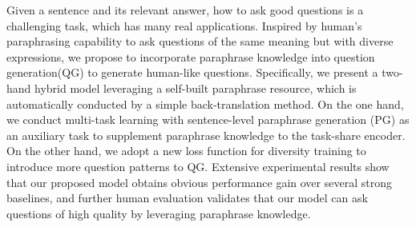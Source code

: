 Given a sentence and its relevant answer, how to ask good questions is a challenging task, which has many real applications. Inspired by human's paraphrasing capability to ask questions of the same meaning but with diverse expressions, we propose to incorporate paraphrase knowledge into question generation(QG) to generate human-like questions. Specifically, we present a two-hand hybrid model leveraging a self-built paraphrase resource, which is automatically conducted by a simple back-translation method. On the one hand, we conduct multi-task learning with sentence-level paraphrase generation (PG) as an auxiliary task to supplement paraphrase knowledge to the task-share encoder. On the other hand, we adopt a new loss function for diversity training to introduce more question patterns to QG. Extensive experimental results show that our proposed model obtains obvious performance gain over several strong baselines, and further human evaluation validates that our model can ask questions of high quality by leveraging paraphrase knowledge.

